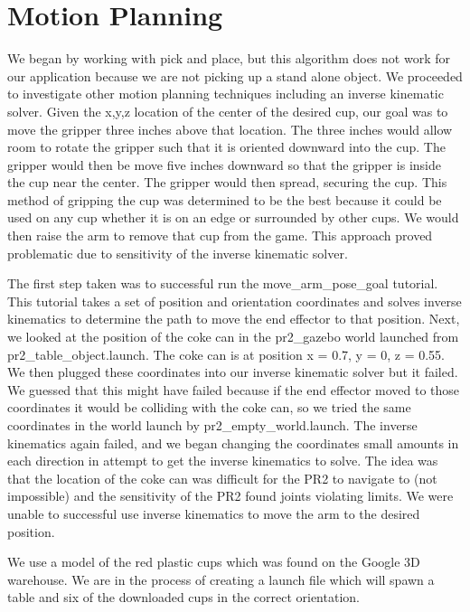 \documentclass[letterpaper, 10 pt, conference]{ieeeconf}  %
\begin{document}
\section{Motion Planning}

We began by working with pick and place, but this algorithm does not work for our application because we are not picking up a stand alone object. We proceeded to investigate other motion planning techniques including an inverse kinematic solver. Given the x,y,z location of the center of the desired cup, our goal was to move the gripper three inches above that location. The three inches would allow room to rotate the gripper such that it is oriented downward into the cup. The gripper would then be move five inches downward so that the gripper is inside the cup near the center. The gripper would then spread, securing the cup. This method of gripping the cup was determined to be the best because it could be used on any cup whether it is on an edge or surrounded by other cups. We would then raise the arm to remove that cup from the game.  This approach proved problematic due to sensitivity of the inverse kinematic solver. 

The first step taken was to successful run the move\_arm\_pose\_goal tutorial. This tutorial takes a set of position and orientation coordinates and solves inverse kinematics to determine the path to move the end effector to that position. Next, we looked at the position of the coke can in the pr2\_gazebo world launched from pr2\_table\_object.launch. The coke can is at position x = 0.7, y = 0, z = 0.55. We then plugged these coordinates into our inverse kinematic solver but it failed. We guessed that this might have failed because if the end effector moved to those coordinates it would be colliding with the coke can, so we tried the same coordinates in the world launch by pr2\_empty\_world.launch. The inverse kinematics again failed, and we began changing the coordinates small amounts in each direction in attempt to get the inverse kinematics to solve. The idea was that the location of the coke can was difficult for the PR2 to navigate to (not impossible) and the sensitivity of the PR2 found joints violating limits. We were unable to successful use inverse kinematics to move the arm to the desired position.

We use a model of the red plastic cups which was found on the Google 3D warehouse. We are in the process of creating a launch file which will spawn a table and six of the downloaded cups in the correct orientation.
\end{document}
